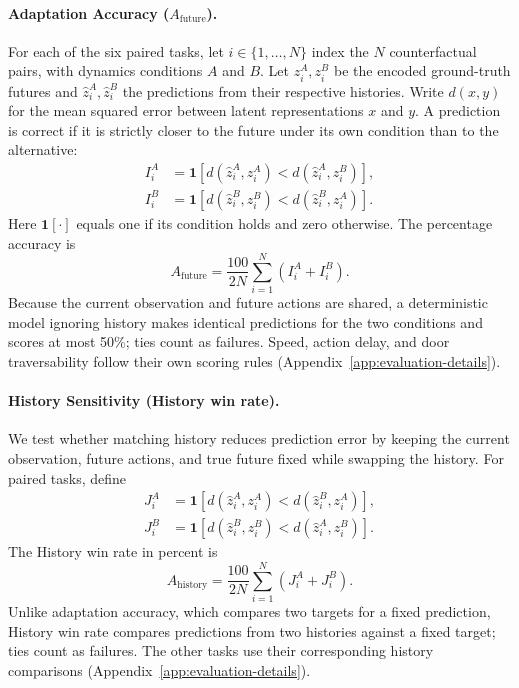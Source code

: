 \paragraph{Adaptation Accuracy ($A_{\mathrm{future}}$).}
For each of the six paired tasks, let $i\in\{1,\ldots,N\}$ index the $N$ counterfactual pairs, with dynamics conditions $A$ and $B$.
Let $z_i^A,z_i^B$ be the encoded ground-truth futures and $\hat z_i^A,\hat z_i^B$ the predictions from their respective histories.
Write $d(x,y)$ for the mean squared error between latent representations $x$ and $y$.
A prediction is correct if it is strictly closer to the future under its own condition than to the alternative:
\begin{equation}
\begin{aligned}
I_i^A &= \mathbf{1}[d(\hat z_i^A,z_i^A)<d(\hat z_i^A,z_i^B)],\\
I_i^B &= \mathbf{1}[d(\hat z_i^B,z_i^B)<d(\hat z_i^B,z_i^A)].
\end{aligned}
\end{equation}
Here $\mathbf{1}[\cdot]$ equals one if its condition holds and zero otherwise.
The percentage accuracy is
\begin{equation}
A_{\mathrm{future}}=\frac{100}{2N}\sum_{i=1}^{N}(I_i^A+I_i^B).
\label{eq:future-score}
\end{equation}
Because the current observation and future actions are shared, a deterministic model ignoring history makes identical predictions for the two conditions and scores at most 50\%; ties count as failures.
Speed, action delay, and door traversability follow their own scoring rules (Appendix~\ref{app:evaluation-details}).

\paragraph{History Sensitivity (History win rate).}
We test whether matching history reduces prediction error by keeping the current observation, future actions, and true future fixed while swapping the history.
For paired tasks, define
\begin{equation}
\begin{aligned}
J_i^A &= \mathbf{1}[d(\hat z_i^A,z_i^A)<d(\hat z_i^B,z_i^A)],\\
J_i^B &= \mathbf{1}[d(\hat z_i^B,z_i^B)<d(\hat z_i^A,z_i^B)].
\end{aligned}
\end{equation}
The History win rate in percent is
\begin{equation}
A_{\mathrm{history}}=\frac{100}{2N}\sum_{i=1}^{N}(J_i^A+J_i^B).
\end{equation}
Unlike adaptation accuracy, which compares two targets for a fixed prediction, History win rate compares predictions from two histories against a fixed target; ties count as failures.
The other tasks use their corresponding history comparisons (Appendix~\ref{app:evaluation-details}).


